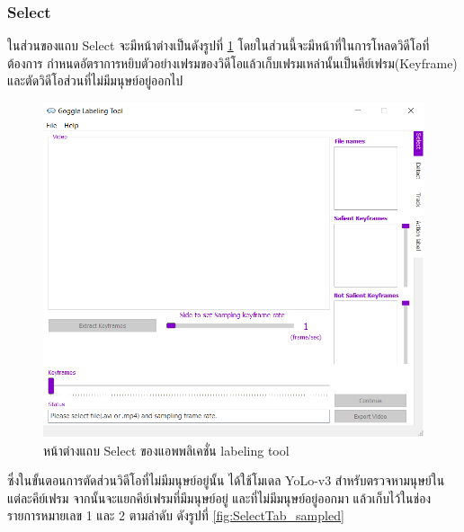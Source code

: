 \subsubsection{Select}
ในส่วนของแถบ Select จะมีหน้าต่างเป็นดังรูปที่ \ref{fig:selectTab} โดยในส่วนนี้จะมีหน้าที่ในการโหลดวิดีโอที่ต้องการ
กำหนดอัตราการหยิบตัวอย่างเฟรมของวิดีโอแล้วเก็บเฟรมเหล่านั้นเป็นคีย์เฟรม(Keyframe) และตัดวิดีโอส่วนที่ไม่มีมนุษย์อยู่ออกไป
\begin{figure}[!ht]
    \centering
    \includegraphics[width=1\textwidth]{chapter3/images/3_6/SelectTab.png}
    \caption{หน้าต่างแถบ Select ของแอพพลิเคชั่น labeling tool}
    \label{fig:selectTab}
\end{figure}
\clearpage
ซึ่งในขั้นตอนการตัดส่วนวิดีโอที่ไม่มีมนุษย์อยู่นั้น ได้ใช้โมเดล YoLo-v3 สำหรับตรวจหามนุษย์ในแต่ละคีย์เฟรม
จากนั้นจะแยกคีย์เฟรมที่มีมนุษย์อยู่ และที่ไม่มีมนุษย์อยู่ออกมา แล้วเก็บไว้ในช่องรายการหมายเลข 1 และ 2 ตามลำดับ
ดังรูปที่ \ref{fig:SelectTab_sampled}

